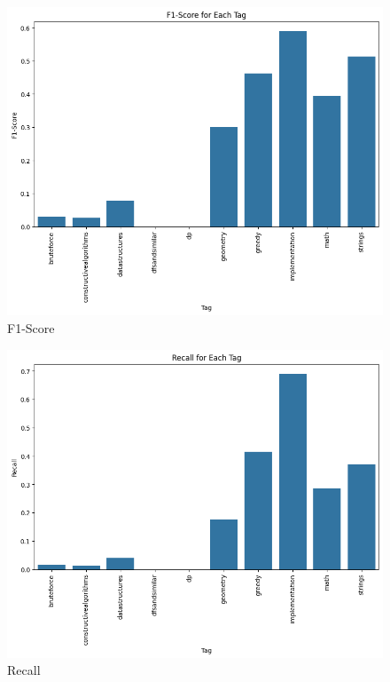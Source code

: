 \documentclass{article}
\begin{document}
\begin{figure}[H]
    \centering
    \includegraphics[scale=0.49]{imgs/f1nb.png}
    \caption{F1-Score}
    \label{fig:f1}
\end{figure}
\begin{figure}[H]
    \centering
    \includegraphics[scale=0.49]{imgs/recallnb.png}
    \caption{Recall}
    \label{fig:r}
\end{figure}
\end{document}
